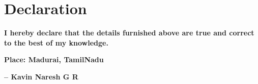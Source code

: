 \documentclass[letterpaper,10pt]{article}
\begin{document}

\section{Declaration}
  \vspace{6pt}
  
  {\textbf{I hereby declare that the details furnished above are true and correct to the best of my knowledge.}}
  
  \begin{flushleft}
    \textbf{Place: Madurai, TamilNadu}
  \end{flushleft}
  
  \begin{flushright}
    \textbf{-- Kavin Naresh G R}
  \end{flushright}


\end{document}

